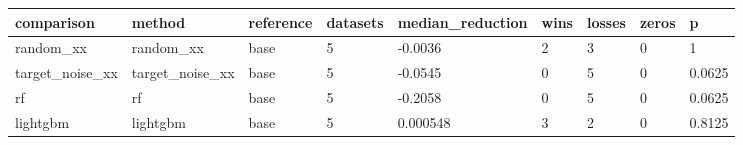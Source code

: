 \begin{tabular}{lllllllll}
\toprule
comparison & method & reference & datasets & median\_reduction & wins & losses & zeros & p \\
\midrule
random\_xx & random\_xx & base & 5 & -0.0036 & 2 & 3 & 0 & 1 \\
target\_noise\_xx & target\_noise\_xx & base & 5 & -0.0545 & 0 & 5 & 0 & 0.0625 \\
rf & rf & base & 5 & -0.2058 & 0 & 5 & 0 & 0.0625 \\
lightgbm & lightgbm & base & 5 & 0.000548 & 3 & 2 & 0 & 0.8125 \\
\bottomrule
\end{tabular}

